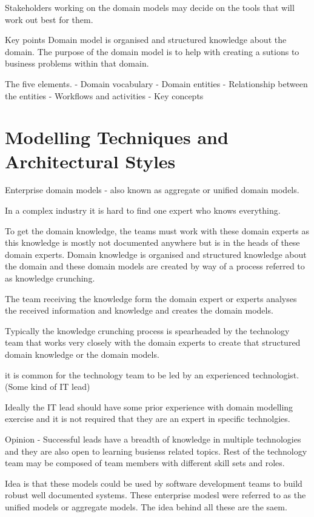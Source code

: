 \documentclass[a4paper, 11pt]{book}
\begin{document}
    Stakeholders working on the domain models may decide on the tools that will work out best for them.

    Key points
    Domain model is organised and structured knowledge about the domain.
    The purpose of the domain model is to help with creating a sutions to business problems within that domain.

    The five elements.
    - Domain vocabulary
    - Domain entities
    - Relationship between the entities
    - Workflows and activities
    - Key concepts


    \section{Modelling Techniques and Architectural Styles}
    Enterprise domain models - also known as aggregate or unified domain models.

    In a complex industry it is hard to find one expert who knows everything.

    To get the domain knowledge, the teams must work with these domain experts as this knowledge is mostly not documented anywhere but is in the heads of these domain experts.
    Domain knowledge is organised and structured knowledge about the domain and these domain models are created by way of a process referred to as knowledge crunching.

    The team receiving the knowledge form the domain expert or experts analyses the received information and knowledge and creates the domain models.

    Typically the knowledge crunching process is spearheaded by the technology team that works very closely with the domain experts to create that structured domain knowledge or the domain models.

    it is common for the technology team to be led by an experienced technologist. (Some kind of IT lead)

    Ideally the IT lead should have some prior experience with domain modelling exercise and it is not required that they are an expert in specific technolgies.

    Opinion
    - Successful leads have a breadth of knowledge in multiple technologies and they are also open to learning busienss related topics.
    Rest of the technology team may be composed of team members with different skill sets and roles.

    Idea is that these models could be used by software development teams to build robust well documented systems.
    These enterprise modesl were referred to as the unified models or aggregate models.
    The idea behind all these are the saem.
\end{document}
